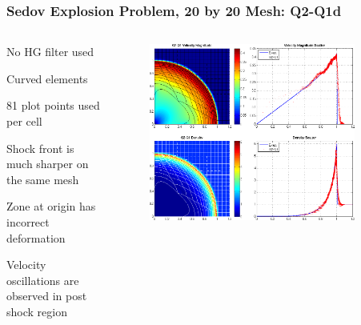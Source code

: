 \documentclass[8pt,xcolor=svgnames]{beamer}
\begin{document}
\begin{frame}
 \frametitle{Sedov Explosion Problem, 20 by 20 Mesh: Q2-Q1d}
 \begin{columns}[T]
  \begin{column}{0.24\textwidth}
  \bigskip
   \begin{itemize}
   \tiny{
    \item No HG filter used
    \item Curved elements
    \item 81 plot points used per cell
    \item Shock front is much sharper on the same mesh
    \item Zone at origin has incorrect deformation
    \item Velocity oscillations are observed in post shock region
    }
   \end{itemize}
  \end{column}
  \begin{column}{0.8\textwidth}
   \begin{figure}[h!]
    \centering
    \includegraphics[width=0.9\textwidth,keepaspectratio=true]{./Images/NewSedov_Q2Q1.png}
    \end{figure}
  \end{column}
 \end{columns}
\end{frame}
\end{document}
